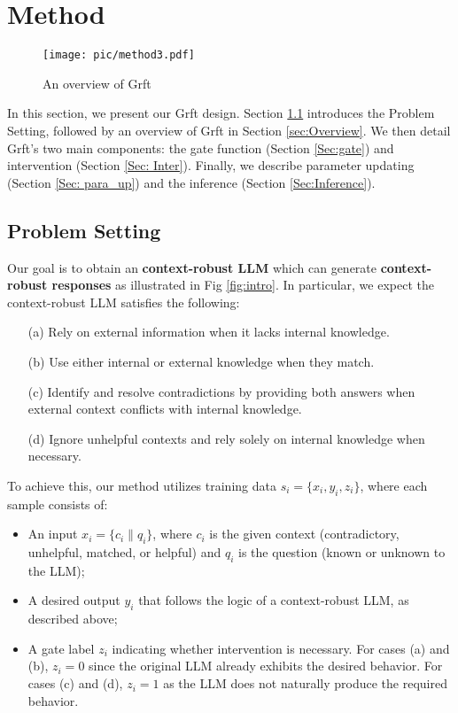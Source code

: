 
\section{Method}
\begin{figure}[t]
    \centering
    \texttt{[image: pic/method3.pdf]}
    
    \caption{An overview of Grft}
    \label{fig:grft}
     \vspace{-0.2in}
\end{figure}
\label{Sec: Representation}


In this section, we present our Grft design. Section \ref{sec:ps} introduces the Problem Setting, followed by an overview of Grft in Section \ref{sec:Overview}. We then detail Grft's two main components: the gate function (Section \ref{Sec:gate}) and intervention (Section \ref{Sec: Inter}). Finally, we describe parameter updating (Section \ref{Sec: para_up}) and the inference (Section \ref{Sec:Inference}).
\subsection{Problem Setting}
\label{sec:ps}

Our goal is to obtain an \textbf{context-robust LLM} which can generate \textbf{context-robust responses} as illustrated in Fig \ref{fig:intro}. In particular, we expect the context-robust LLM satisfies the following:

\begin{itemize}[noitemsep,topsep=0pt] %
    \item[(a)] Rely on external information when it lacks internal knowledge.  
    \item[(b)] Use either internal or external knowledge when they match. 
    \item[(c)] Identify and resolve contradictions by providing both answers when external context conflicts with internal knowledge.  
    \item[(d)] Ignore unhelpful contexts and rely solely on internal knowledge when necessary.  
\end{itemize}

To achieve this, our method utilizes training data \( s_i = \{x_i, y_i, z_i\} \), where each sample consists of:  
\begin{itemize}[noitemsep,topsep=0pt] %
    \item An input \( x_i = \{c_i \parallel q_i\} \), where \( c_i \) is the given context (contradictory, unhelpful, matched, or helpful) and \( q_i \) is the question (known or unknown to the LLM);  
    \item A desired output \( y_i \) that follows the logic of a context-robust LLM, as described above;  
    \item A gate label \( z_i \) indicating whether intervention is necessary. For cases (a) and (b), \( z_i = 0 \) since the original LLM already exhibits the desired behavior. For cases (c) and (d), \( z_i = 1 \) as the LLM does not naturally produce the required behavior.  
\end{itemize}

